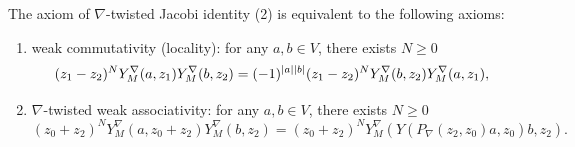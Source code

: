 \documentclass[final,reqno]{amsart}
\begin{document}
    
\begin{prp}
    The axiom of $\nabla$-twisted Jacobi identity (2) is equivalent to the following axioms:
    \begin{enumerate}[label=(2-\arabic*)]
        \item
        weak commutativity (locality): for any $a,b\in V$, there exists $N\geq 0$
        \begin{equation}\label{eq: weak commutativity}
            (z_1-z_2)^NY^\nabla_M(a,z_1)Y^\nabla_M(b,z_2)=(-1)^{\left| a \right|\left| b \right|}(z_1-z_2)^NY^\nabla_M(b,z_2)Y^\nabla_M(a,z_1),
        \end{equation}
        \item 
        $\nabla$-twisted weak associativity: for any $a,b\in V$, there exists $N\geq 0$
        \begin{equation}\label{eq: nabla tw weak associativity}
            (z_0+z_2)^NY^\nabla_M(a,z_0+z_2)Y^\nabla_M(b,z_2)=(z_0+z_2)^NY^\nabla_M(Y(P_\nabla(z_2,z_0)a,z_0)b,z_2).
        \end{equation}
    \end{enumerate}
\end{prp}
\end{document}

